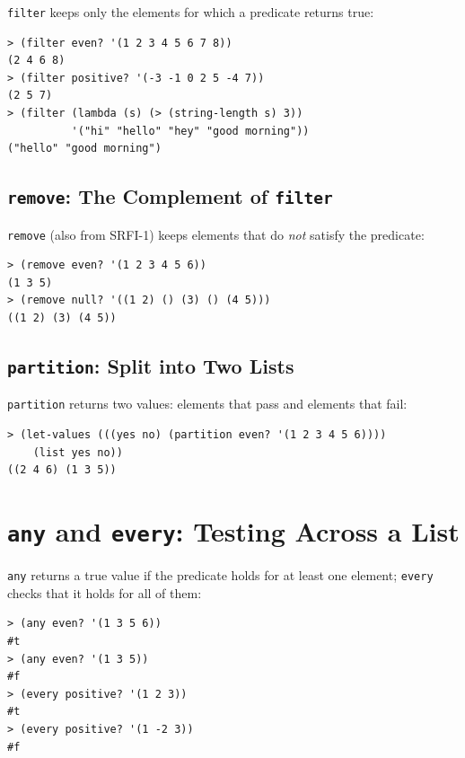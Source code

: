 \texttt{filter} keeps only the elements for which a predicate returns true:

\begin{lstlisting}[style=repl]
> (filter even? '(1 2 3 4 5 6 7 8))
(2 4 6 8)
> (filter positive? '(-3 -1 0 2 5 -4 7))
(2 5 7)
> (filter (lambda (s) (> (string-length s) 3))
          '("hi" "hello" "hey" "good morning"))
("hello" "good morning")
\end{lstlisting}

\subsection{\texttt{remove}: The Complement of \texttt{filter}}

\texttt{remove} (also from SRFI-1) keeps elements that do \emph{not} satisfy the predicate:

\begin{lstlisting}[style=repl]
> (remove even? '(1 2 3 4 5 6))
(1 3 5)
> (remove null? '((1 2) () (3) () (4 5)))
((1 2) (3) (4 5))
\end{lstlisting}

\subsection{\texttt{partition}: Split into Two Lists}

\texttt{partition} returns two values: elements that pass and elements that fail:

\begin{lstlisting}[style=repl]
> (let-values (((yes no) (partition even? '(1 2 3 4 5 6))))
    (list yes no))
((2 4 6) (1 3 5))
\end{lstlisting}

\section{\texttt{any} and \texttt{every}: Testing Across a List}

\texttt{any} returns a true value if the predicate holds for at least one element; \texttt{every} checks that it holds for all of them:

\begin{lstlisting}[style=repl]
> (any even? '(1 3 5 6))
#t
> (any even? '(1 3 5))
#f
> (every positive? '(1 2 3))
#t
> (every positive? '(1 -2 3))
#f
\end{lstlisting}

